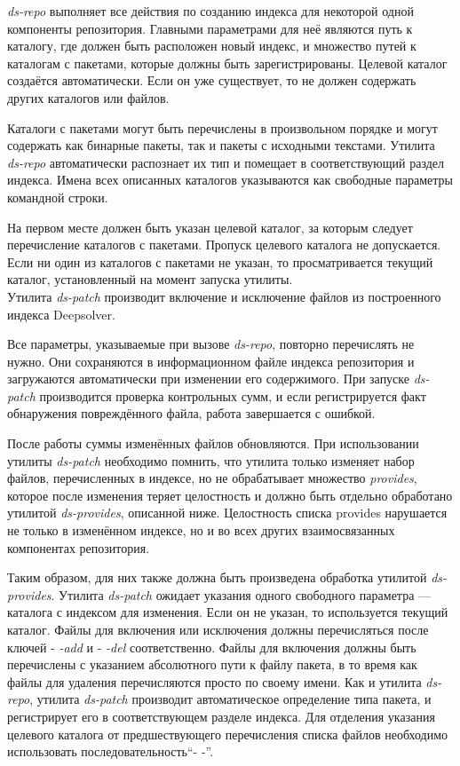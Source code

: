 \textit{ds-repo} выполняет все действия по созданию индекса для некоторой
одной компоненты репозитория. Главными параметрами для неё являются
путь к каталогу, где должен быть расположен новый индекс, и множество
путей к каталогам с пакетами, которые должны быть зарегистрированы. 
Целевой каталог создаётся автоматически. Если он уже существует, то не 
должен содержать других каталогов или файлов. 

Каталоги с пакетами могут
быть перечислены в произвольном порядке и могут содержать как бинарные
пакеты, так и пакеты с исходными текстами. Утилита \textit{ds-repo} автоматически
распознает их тип и помещает в соответствующий раздел индекса. Имена
всех описанных каталогов указываются как свободные параметры командной
строки. 

На первом месте должен быть указан целевой каталог, за которым
следует перечисление каталогов с пакетами. Пропуск целевого каталога
не допускается. Если ни один из каталогов с пакетами не указан, то 
просматривается текущий каталог, установленный на момент запуска утилиты.\\

Утилита \textit{ds-patch} производит включение и исключение файлов из построенного
индекса Deepsolver. 

Все параметры, указываемые при вызове\textit{ ds-repo},
повторно перечислять не нужно. Они сохраняются в информационном файле
индекса репозитория и загружаются автоматически при изменении его содержимого.
При запуске \textit{ds-patch} производится проверка контрольных сумм, и
если регистрируется факт обнаружения повреждённого файла, работа завершается
с ошибкой. 

После работы суммы изменённых файлов обновляются.
При использовании утилиты \textit{ds-patch} необходимо помнить, что утилита
только изменяет набор файлов, перечисленных в индексе, но не обрабатывает 
множество \textit{provides}, которое после изменения теряет целостность и
должно быть отдельно обработано утилитой \textit{ds-provides}, описанной ниже. 
Целостность списка provides нарушается не только в изменённом индексе, но и
во всех других взаимосвязанных компонентах репозитория. 

Таким образом,
для них также должна быть произведена обработка утилитой \textit{ds-provides}.
Утилита \textit{ds-patch} ожидает указания одного свободного параметра --- каталога
с индексом для изменения. Если он не указан, то используется текущий
каталог. Файлы для включения или исключения должны перечисляться после ключей
- \textit{-add} и - \textit{-del} соответственно. Файлы для включения должны быть перечислены 
с указанием абсолютного пути к файлу пакета, в то время как файлы для удаления 
перечисляются просто по своему имени. Как и утилита \textit{ds-repo}, утилита \textit{ds-patch}
производит автоматическое определение типа пакета, и регистрирует его в
соответствующем разделе индекса. Для отделения указания целевого каталога 
от предшествующего перечисления списка файлов необходимо использовать
последовательность``- -''.\\


